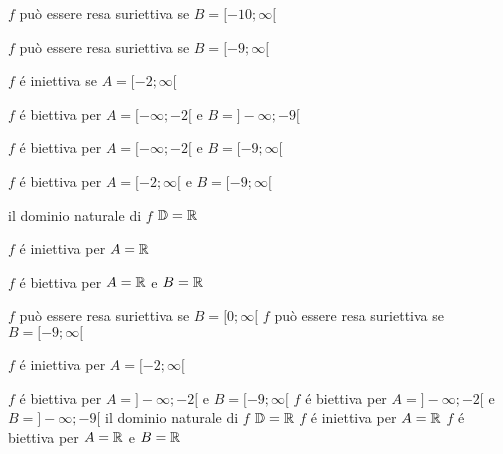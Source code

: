 \begin{questions}
    \question

    \begin{checkboxes}

        \choice $f$ può essere resa suriettiva se $B=[-10;\infty[$

        \CorrectChoice $f$ può essere resa suriettiva se $B=[-9;\infty[$

        \CorrectChoice $f$ é iniettiva se $A=[-2;\infty[$

        \choice $f$ é biettiva per $A=[-\infty;-2[$ e $B=]-\infty;-9[$

        \CorrectChoice $f$ é biettiva per $A=[-\infty;-2[$ e $B=[-9;\infty[$

        \CorrectChoice $f$ é biettiva per $A=[-2;\infty[$ e $B=[-9;\infty[$

        \CorrectChoice il dominio naturale di $f$ $\mathbb{D}=\mathbb{R}$

        \choice $f$ é iniettiva per $A=\mathbb{R}$

        \choice $f$ é biettiva per $A=\mathbb{R}$ e $B=\mathbb{R}$

    \end{checkboxes}

    \question

    \begin{checkboxes}

        \CorrectChoice $f$  può essere resa suriettiva se  $B=[0;\infty[$
        \CorrectChoice $f$  può essere resa suriettiva se  $B=[-9;\infty[$

        \CorrectChoice $f$ é iniettiva per $A=[-2;\infty[$

                    \choice $f$ é biettiva per $A=]-\infty;-2[$ e $B=[-9;\infty[$
                    \CorrectChoice $f$ é biettiva per $A=]-\infty;-2[$ e $B=]-\infty;-9[$
        \CorrectChoice il dominio naturale di $f$ $\mathbb{D}=\mathbb{R}$
        \CorrectChoice $f$ é iniettiva per $A=\mathbb{R}$
        \CorrectChoice $f$ é biettiva per $A=\mathbb{R}$ e $B=\mathbb{R}$

    \end{checkboxes}
\end{questions}


